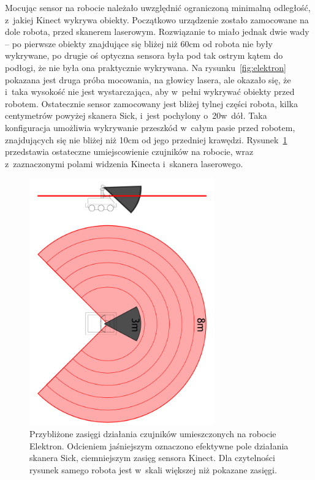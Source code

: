 Mocując sensor na robocie należało uwzględnić ograniczoną minimalną odległość,
z~jakiej Kinect wykrywa obiekty. Początkowo urządzenie zostało zamocowane na
dole robota, przed skanerem laserowym. Rozwiązanie to miało jednak dwie wady --
po pierwsze obiekty znajdujące się bliżej niż 60cm od robota nie były
wykrywane, po drugie oś optyczna sensora była pod tak ostrym kątem do podłogi,
że nie była ona praktycznie wykrywana. Na rysunku~\ref{fig:elektron} pokazana
jest druga próba mocowania, na głowicy lasera, ale okazało się, że i~taka
wysokość nie jest wystarczająca, aby w~pełni wykrywać obiekty przed robotem.
Ostatecznie sensor zamocowany jest bliżej tylnej części robota, kilka
centymetrów powyżej skanera Sick, i~jest pochylony o~20\textdegree w~dół. Taka
konfiguracja umożliwia wykrywanie przeszkód w~całym pasie przed robotem,
znajdujących się nie bliżej niż 10cm od jego przedniej krawędzi.
Rysunek~\ref{fig:range} przedstawia ostateczne umiejscowienie czujników
na robocie, wraz z~zaznaczonymi polami widzenia Kinecta i~skanera laserowego.



\begin{figure}[htb!]
\centering
\includegraphics[width=8cm]{../../Common/img/elektron/range_raster}
\caption[Przybliżone zasięgi działania czujników umieszczonych na robocie
Elektron]{Przybliżone zasięgi działania czujników umieszczonych na robocie
Elektron. Odcieniem jaśniejszym oznaczono efektywne pole działania skanera Sick,
ciemniejszym zasięg sensora Kinect. Dla czytelności rysunek samego robota
jest w~skali większej niż pokazane zasięgi.}
\label{fig:range}
\end{figure}


